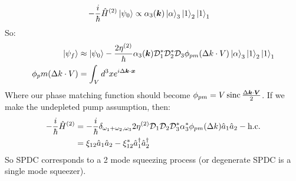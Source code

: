 \begin{align*}
	-\frac{i}{\hbar}\hat{H}^{(2)}\ket{\psi_0} &\propto \alpha_3(\bm{k})\ket{\alpha}_3\ket{1}_2\ket{1}_1 
\end{align*}
So:
\begin{align*}
	\ket{\psi_f} &\approx \ket{\psi_0} - \frac{2\eta^{(2)}}{\hbar}\alpha_3(\bm{k})\mathcal{D}_1^*\mathcal{D}_2^* \mathcal{D}_3 \phi_{pm}(\Delta k\cdot V)\ket{\alpha}_3\ket{1}_2\ket{1}_1 \\
	\phi_pm(\Delta k\cdot V) &= \int_V d^3 x e^{i\Delta \bm{k}\cdot \bm{x}}
\end{align*}
Where our phase matching function should become $\phi_{pm} = V\operatorname{sinc} \frac{\Delta \bm{k}\cdot \bm{V}}{2}$. If we make the undepleted pump assumption, then:
\begin{align*}
	-\frac{i}{\hbar}\hat{H}^{(2)} &= - \frac{i}{\hbar} \delta_{\omega_1+\omega_2,\omega_3} 2\eta^{(2)}\mathcal{D}_1\mathcal{D}_2\mathcal{D}_3^*\alpha_3^*\phi_{pm}(\Delta k)\hat{a}_1\hat{a}_2 - \text{h.c.} \\
	&= \xi_{12}\hat{a}_1\hat{a}_2 - \xi^*_{12}\hat{a}_1^\dagger\hat{a}_2^\dagger
\end{align*}
So SPDC corresponds to a 2 mode squeezing process (or degenerate SPDC is a single mode squeezer).
